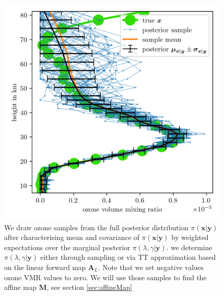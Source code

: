 \begin{figure}[ht!]
	\centering
	\includegraphics{FirstTestRes.png}
	\caption[Ozone samples of the full posterior.]{We draw ozone samples from the full posterior distribution $\pi(\bm{x}| \bm{y})$ after characterising mean and covariance of $\pi(\bm{x}| \bm{y})$ by weighted expectations over the marginal posterior $\pi(\lambda,\gamma | \bm{y})$. we determine  $\pi(\lambda, \gamma | \bm{y})$ either through sampling or via TT approximation based on the linear forward map $\bm{A}_L$. Note that we set negative values ozone VMR values to zero. We will use those samples to find the affine map $\bm{M}$, see section \ref{sec:affineMap}}
	\label{fig:O3Samp}
\end{figure}
\clearpage
%

